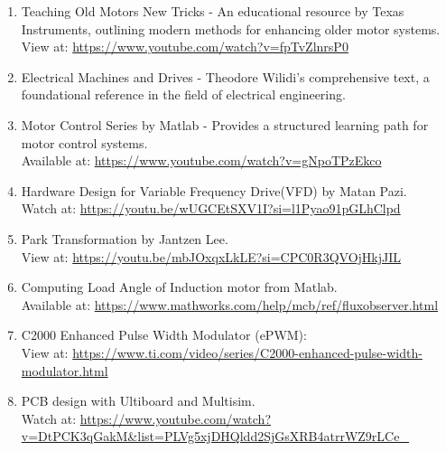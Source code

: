 \begin{enumerate}
      \item Teaching Old Motors New Tricks - An educational resource by Texas Instruments, outlining modern methods for enhancing older motor systems.\\
            View at: \url{https://www.youtube.com/watch?v=fpTvZlnrsP0}

      \item Electrical Machines and Drives - Theodore Wilidi's comprehensive text, a foundational reference in the field of electrical engineering.

      \item Motor Control Series by Matlab - Provides a structured learning path for motor control systems.\\
            Available at: \url{https://www.youtube.com/watch?v=gNpoTPzEkco}

      \item Hardware Design for Variable Frequency Drive(VFD) by Matan Pazi.\\
            Watch at: \url{https://youtu.be/wUGCEtSXV1I?si=l1Pyao91pGLhClpd}

      \item Park Transformation by Jantzen Lee.\\
            View at: \url{https://youtu.be/mbJOxqxLkLE?si=CPC0R3QVOjHkjJIL}

      \item Computing Load Angle of Induction motor from Matlab.\\
            Available at: \url{https://www.mathworks.com/help/mcb/ref/fluxobserver.html}

      \item C2000 Enhanced Pulse Width Modulator (ePWM):\\
            View at: \url{https://www.ti.com/video/series/C2000-enhanced-pulse-width-modulator.html}


      \item PCB design with Ultiboard and Multisim.\\
            Watch at: \url{https://www.youtube.com/watch?v=DtPCK3qGakM&list=PLVg5xjDHQldd2SjGsXRB4atrrWZ9rLCe_}



\end{enumerate}

